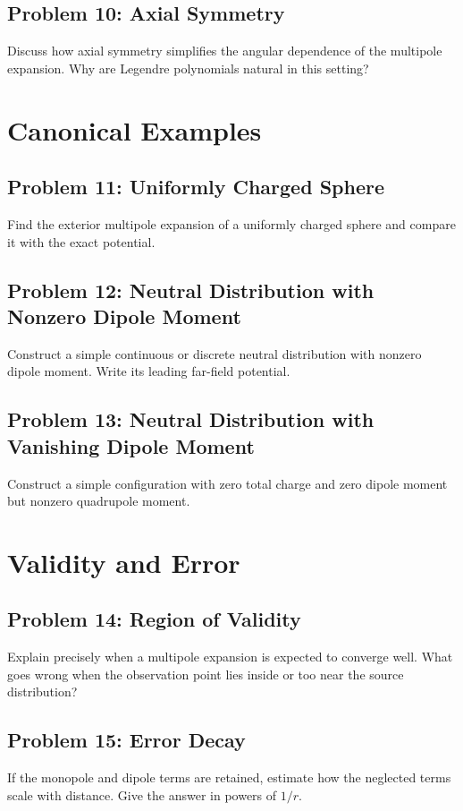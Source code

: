 \documentclass[hidelinks]{article}
\begin{document}
\subsection{Problem 10: Axial Symmetry}
Discuss how axial symmetry simplifies the angular dependence of the multipole expansion. Why are Legendre polynomials natural in this setting?

\section{Canonical Examples}
\subsection{Problem 11: Uniformly Charged Sphere}
Find the exterior multipole expansion of a uniformly charged sphere and compare it with the exact potential.

\subsection{Problem 12: Neutral Distribution with Nonzero Dipole Moment}
Construct a simple continuous or discrete neutral distribution with nonzero dipole moment. Write its leading far-field potential.

\subsection{Problem 13: Neutral Distribution with Vanishing Dipole Moment}
Construct a simple configuration with zero total charge and zero dipole moment but nonzero quadrupole moment.

\section{Validity and Error}
\subsection{Problem 14: Region of Validity}
Explain precisely when a multipole expansion is expected to converge well. What goes wrong when the observation point lies inside or too near the source distribution?

\subsection{Problem 15: Error Decay}
If the monopole and dipole terms are retained, estimate how the neglected terms scale with distance. Give the answer in powers of $1/r$.
\end{document}
